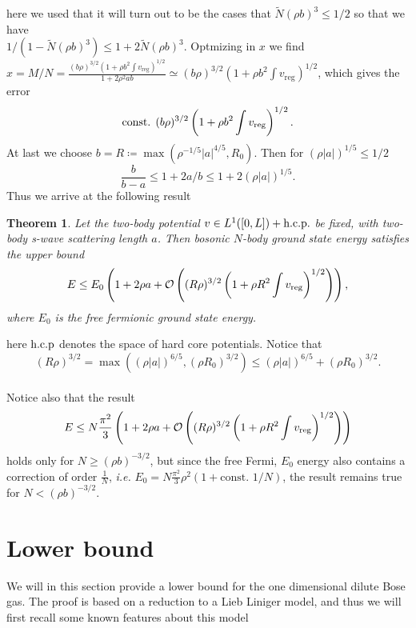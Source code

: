 \documentclass[a4paper,11pt]{article}
\newcommand{\abs}[1]{\left\lvert #1 \right\rvert}
\newcommand{\ie}{\emph{i.e.} }
\newtheorem{theorem}{Theorem}
\numberwithin{equation}{section}
\begin{document}
	here we used that it will turn out to be the cases that $ \tilde{N}(\rho b)^3\leq 1/2 $ so that we have\\ $ 1/(1-\tilde{N}(\rho b)^3)\leq 1+2\tilde{N}(\rho b)^3 $.
	Optmizing in $ x $ we find $ x=M/N=\frac{(b\rho)^{3/2}\left(1+\rho b^2\int v_{\text{reg}}\right)^{1/2}}{1+2\rho^2 a b}\simeq(b\rho)^{3/2}\left(1+\rho b^2\int v_{\text{reg}}\right)^{1/2} $, which gives the error \begin{equation}
	\text{const. }(b\rho)^{3/2}\left(1+\rho b^2 \int v_{\textnormal{reg}}\right)^{1/2}.
	\end{equation}
	At last we choose $ b=R\coloneqq\max(\rho^{-1/5}\abs{a}^{4/5},R_0) $. Then for $(\rho \abs{a})^{1/5}\leq 1/2$ $$ \frac{b}{b-a}\leq1+2a/b\leq  1+2(\rho\abs{a})^{1/5}. $$
	Thus we arrive at the following result
	\begin{theorem}
		Let the two-body potential $ v\in L^{1}([0,L])+\textnormal{h.c.p.} $ be fixed, with two-body s-wave scattering length $ a $. Then bosonic $ N $-body ground state energy satisfies the upper bound\begin{equation}
		E\leq E_0\left(1+2\rho a + \mathcal{O}\left((R\rho)^{3/2}\left(1+\rho R^2 \int v_{\textnormal{reg}}\right)^{1/2}\right)\right),
		\end{equation}
		where $ E_0 $ is the free fermionic ground state energy.
	\end{theorem}
	here $ \textnormal{h.c.p} $ denotes the space of hard core potentials. Notice that $$ (R\rho)^{3/2}= \max\left((\rho \abs{a})^{6/5},(\rho R_0)^{3/2}\right)\leq  (\rho \abs{a})^{6/5}+(\rho R_0)^{3/2}. $$\\
	Notice also that the result \begin{equation}
	E\leq N\frac{\pi^2}{3}\left(1+2\rho a + \mathcal{O}\left((R\rho)^{3/2}\left(1+\rho R^2 \int v_{\textnormal{reg}}\right)^{1/2}\right)\right)
	\end{equation}
	holds only for $ N\geq (\rho b)^{-3/2} $, but since the free Fermi, $ E_0 $ energy also contains a correction of order $ \frac{1}{N} $, \ie $ E_0=N\frac{\pi^2}{3}\rho^2(1+\text{const. }1/N) $, the result remains true for $ N<(\rho b)^{-3/2}$.

	\section{Lower bound}
	We will in this section provide a lower bound for the one dimensional dilute Bose gas. The proof is based on a reduction to a Lieb Liniger model, and thus we will first recall some known features about this model
\end{document}

